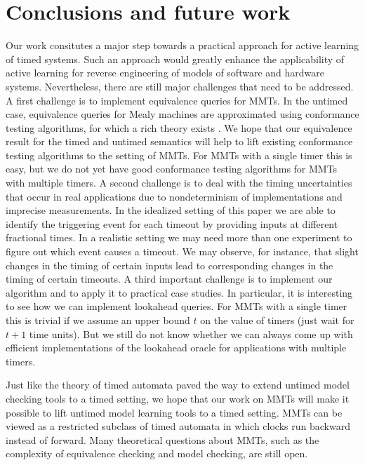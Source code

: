 \vspace{-1em}
\section{Conclusions and future work}
\label{conclusions}

\vspace{-1em}
Our work consitutes a major step towards a practical approach for active learning of timed systems.
Such an approach would greatly enhance the applicability of active learning for reverse engineering of models of
software and hardware systems. Nevertheless, there are still major challenges that need to be addressed.
%
A first challenge is to implement equivalence queries for MMTs.
In the untimed case, equivalence queries for Mealy machines are approximated using conformance testing algorithms,
for which a rich theory exists \cite{LeeY96}.
We hope that our equivalence result for the timed and untimed semantics will help to lift existing conformance
testing algorithms to the setting of MMTs. For MMTs with a single timer this is easy, but we do not yet have good
conformance testing algorithms for MMTs with multiple timers.
%
A second challenge is to deal with the timing uncertainties that occur in real applications due to nondeterminism of
implementations and imprecise measurements. In the idealized setting of this paper we are able to
identify the triggering event for each timeout by providing inputs at different fractional times. In a realistic
setting we may need more than one experiment to figure out which event causes a timeout. We may observe, for instance,
that slight changes in the timing of certain inputs lead to corresponding changes in the timing of certain timeouts.
%
A third important challenge is to implement our algorithm and to apply it to practical case studies. In particular,
it is interesting to see how we can implement lookahead queries. For MMTs with a single timer this is trivial 
if we assume an upper bound $t$ on the value of timers (just  wait for $t+1$ time units).
But we still do not know whether we can always come up with efficient implementations of the lookahead oracle for applications with multiple timers.

\iflong
Just like the theory of timed automata \cite{AD94} paved the way to extend untimed model checking tools to a timed
setting, we hope that our work on MMTs will make it possible to lift untimed model learning tools to a timed setting.
MMTs can be viewed as a restricted subclass of timed automata in which clocks run backward instead of forward.
Many theoretical questions about MMTs, such as the complexity of equivalence checking and model checking, are still open.
\fi
